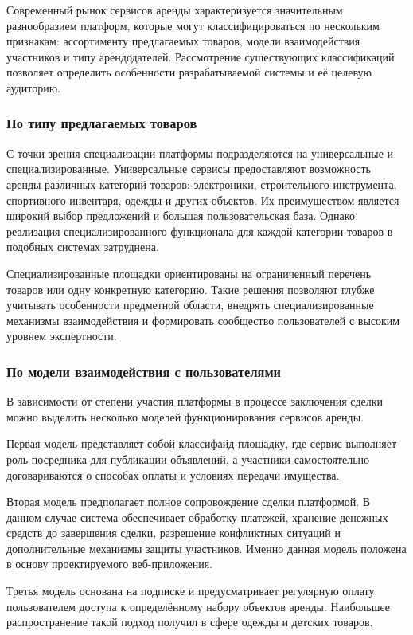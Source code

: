 Современный рынок сервисов аренды характеризуется значительным разнообразием платформ, которые могут классифицироваться по нескольким признакам: ассортименту предлагаемых товаров, модели взаимодействия участников и типу арендодателей. Рассмотрение существующих классификаций позволяет определить особенности разрабатываемой системы и её целевую аудиторию.

\subsubsection{По типу предлагаемых товаров}

С точки зрения специализации платформы подразделяются на универсальные и специализированные. Универсальные сервисы предоставляют возможность аренды различных категорий товаров: электроники, строительного инструмента, спортивного инвентаря, одежды и других объектов. Их преимуществом является широкий выбор предложений и большая пользовательская база. Однако реализация специализированного функционала для каждой категории товаров в подобных системах затруднена.

Специализированные площадки ориентированы на ограниченный перечень товаров или одну конкретную категорию. Такие решения позволяют глубже учитывать особенности предметной области, внедрять специализированные механизмы взаимодействия и формировать сообщество пользователей с высоким уровнем экспертности.

\subsubsection{По модели взаимодействия с пользователями}

В зависимости от степени участия платформы в процессе заключения сделки можно выделить несколько моделей функционирования сервисов аренды.

Первая модель представляет собой классифайд-площадку, где сервис выполняет роль посредника для публикации объявлений, а участники самостоятельно договариваются о способах оплаты и условиях передачи имущества.

Вторая модель предполагает полное сопровождение сделки платформой. В данном случае система обеспечивает обработку платежей, хранение денежных средств до завершения сделки, разрешение конфликтных ситуаций и дополнительные механизмы защиты участников. Именно данная модель положена в основу проектируемого веб-приложения.

Третья модель основана на подписке и предусматривает регулярную оплату пользователем доступа к определённому набору объектов аренды. Наибольшее распространение такой подход получил в сфере одежды и детских товаров.

